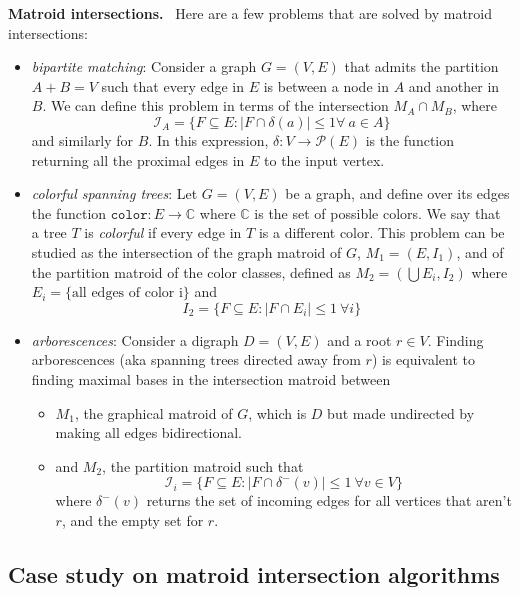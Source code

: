 \documentclass{report}
\newcommand{\II}{\ensuremath{\mathcal{I}}}
\newcommand{\aparte}[2]{
    \vspace{0.5em}
    \begin{adjustwidth}{20pt}{0pt}
        \begin{boxxx}
            \textbf{#1.}\ #2
        \end{boxxx}
    \end{adjustwidth}
    \vspace{0.75em}
}
\begin{document}
  \aparte{Matroid intersections}{
    Here are a few problems that are solved by matroid intersections:
    \begin{itemize}
      \item \emph{bipartite matching}: Consider a graph $G = (V, E)$ that admits the partition $A + B = V$ such that every edge in $E$ is between a node in $A$ and another in $B$. We can define this problem in terms of the intersection $M_A \cap M_B$, where \[\II_A = \{F \subseteq E : |F \cap \delta(a)| \leqslant 1 \forall \ a \in A\}\] and similarly for $B$. In this expression, $\delta: V \to \mathcal{P}(E)$ is the function returning all the proximal edges in $E$ to the input vertex.

      \item \emph{colorful spanning trees}: Let $G = (V, E)$ be a graph, and define over its edges the function $\texttt{color}: E \to \mathbb{C}$ where $\mathbb{C}$ is the set of possible colors. We say that a tree $T$ is \emph{colorful} if every edge in $T$ is a different color. This problem can be studied as the intersection of the graph matroid of $G$, $M_1 = (E, I_1)$, and of the partition matroid of the color classes, defined as $M_2 = (\bigcup E_i, I_2)$ where $E_i = \{\text{all edges of color i}\}$ and \[I_2 = \{F \subseteq E : |F \cap E_i| \leqslant 1 \ \forall i\} \]

      \item \emph{arborescences}: Consider a digraph $D = (V, E)$ and a root $r \in V$. Finding arborescences (aka spanning trees directed away from $r$) is equivalent to finding maximal bases in the intersection matroid between
      \begin{itemize}
        \item $M_1$, the graphical matroid of $G$, which is $D$ but made undirected by making all edges bidirectional.
        \item and $M_2$, the partition matroid such that \[\II_i = \{F \subseteq E : |F \cap \delta^-(v)| \leqslant 1 \  \forall v \in V\}\] where $\delta^-(v)$ returns the set of incoming edges for all vertices that aren't $r$, and the empty set for $r$.
      \end{itemize}
    \end{itemize}
  }

  \subsection{Case study on matroid intersection algorithms}
\end{document}
